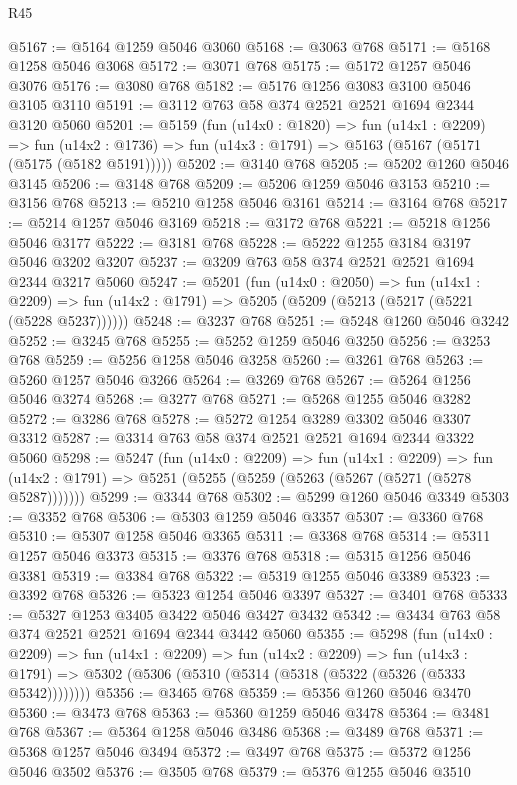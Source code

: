 \begin{lexlean}{R45}
\begin{coremodule}
@5167 := @5164 @1259 @5046 @3060
@5168 := @3063 @768
@5171 := @5168 @1258 @5046 @3068
@5172 := @3071 @768
@5175 := @5172 @1257 @5046 @3076
@5176 := @3080 @768
@5182 := @5176 @1256 @3083 @3100 @5046 @3105 @3110
@5191 := @3112 @763 @58 @374 @2521 @2521 @1694 @2344 @3120 @5060
@5201 := @5159
    (fun (u14x0 : @1820) =>
    fun (u14x1 : @2209) =>
    fun (u14x2 : @1736) => fun (u14x3 : @1791) => @5163 (@5167 (@5171 (@5175 (@5182 @5191)))))
@5202 := @3140 @768
@5205 := @5202 @1260 @5046 @3145
@5206 := @3148 @768
@5209 := @5206 @1259 @5046 @3153
@5210 := @3156 @768
@5213 := @5210 @1258 @5046 @3161
@5214 := @3164 @768
@5217 := @5214 @1257 @5046 @3169
@5218 := @3172 @768
@5221 := @5218 @1256 @5046 @3177
@5222 := @3181 @768
@5228 := @5222 @1255 @3184 @3197 @5046 @3202 @3207
@5237 := @3209 @763 @58 @374 @2521 @2521 @1694 @2344 @3217 @5060
@5247 := @5201
    (fun (u14x0 : @2050) =>
    fun (u14x1 : @2209) =>
    fun (u14x2 : @1791) => @5205 (@5209 (@5213 (@5217 (@5221 (@5228 @5237))))))
@5248 := @3237 @768
@5251 := @5248 @1260 @5046 @3242
@5252 := @3245 @768
@5255 := @5252 @1259 @5046 @3250
@5256 := @3253 @768
@5259 := @5256 @1258 @5046 @3258
@5260 := @3261 @768
@5263 := @5260 @1257 @5046 @3266
@5264 := @3269 @768
@5267 := @5264 @1256 @5046 @3274
@5268 := @3277 @768
@5271 := @5268 @1255 @5046 @3282
@5272 := @3286 @768
@5278 := @5272 @1254 @3289 @3302 @5046 @3307 @3312
@5287 := @3314 @763 @58 @374 @2521 @2521 @1694 @2344 @3322 @5060
@5298 := @5247
    (fun (u14x0 : @2209) =>
    fun (u14x1 : @2209) =>
    fun (u14x2 : @1791) => @5251 (@5255 (@5259 (@5263 (@5267 (@5271 (@5278 @5287)))))))
@5299 := @3344 @768
@5302 := @5299 @1260 @5046 @3349
@5303 := @3352 @768
@5306 := @5303 @1259 @5046 @3357
@5307 := @3360 @768
@5310 := @5307 @1258 @5046 @3365
@5311 := @3368 @768
@5314 := @5311 @1257 @5046 @3373
@5315 := @3376 @768
@5318 := @5315 @1256 @5046 @3381
@5319 := @3384 @768
@5322 := @5319 @1255 @5046 @3389
@5323 := @3392 @768
@5326 := @5323 @1254 @5046 @3397
@5327 := @3401 @768
@5333 := @5327 @1253 @3405 @3422 @5046 @3427 @3432
@5342 := @3434 @763 @58 @374 @2521 @2521 @1694 @2344 @3442 @5060
@5355 := @5298
    (fun (u14x0 : @2209) =>
    fun (u14x1 : @2209) =>
    fun (u14x2 : @2209) =>
    fun (u14x3 : @1791) => @5302 (@5306 (@5310 (@5314 (@5318 (@5322 (@5326 (@5333 @5342))))))))
@5356 := @3465 @768
@5359 := @5356 @1260 @5046 @3470
@5360 := @3473 @768
@5363 := @5360 @1259 @5046 @3478
@5364 := @3481 @768
@5367 := @5364 @1258 @5046 @3486
@5368 := @3489 @768
@5371 := @5368 @1257 @5046 @3494
@5372 := @3497 @768
@5375 := @5372 @1256 @5046 @3502
@5376 := @3505 @768
@5379 := @5376 @1255 @5046 @3510

\end{coremodule}
\end{lexlean}
